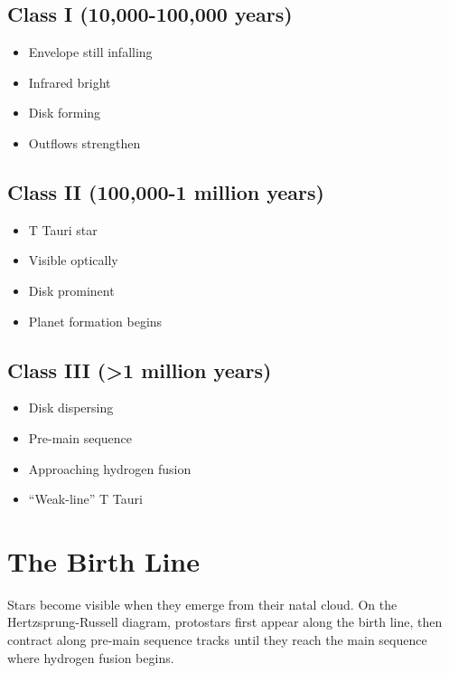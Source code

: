 \documentclass[
  11pt,
  letterpaper,
  twoside,
  openright]{book}
\providecommand{\tightlist}{%
  \setlength{\itemsep}{0pt}\setlength{\parskip}{0pt}}
\begin{document}
\subsection{Class I (10,000-100,000
years)}\label{class-i-10000-100000-years}

\begin{itemize}
\tightlist
\item
  Envelope still infalling
\item
  Infrared bright
\item
  Disk forming
\item
  Outflows strengthen
\end{itemize}

\subsection{Class II (100,000-1 million
years)}\label{class-ii-100000-1-million-years}

\begin{itemize}
\tightlist
\item
  T Tauri star
\item
  Visible optically
\item
  Disk prominent
\item
  Planet formation begins
\end{itemize}

\subsection{Class III (\textgreater1 million
years)}\label{class-iii-1-million-years}

\begin{itemize}
\tightlist
\item
  Disk dispersing
\item
  Pre-main sequence
\item
  Approaching hydrogen fusion
\item
  ``Weak-line'' T Tauri
\end{itemize}

\section{The Birth Line}\label{the-birth-line}

Stars become visible when they emerge from their natal cloud. On the
Hertzsprung-Russell diagram, protostars first appear along the birth
line, then contract along pre-main sequence tracks until they reach the
main sequence where hydrogen fusion begins.
\end{document}
